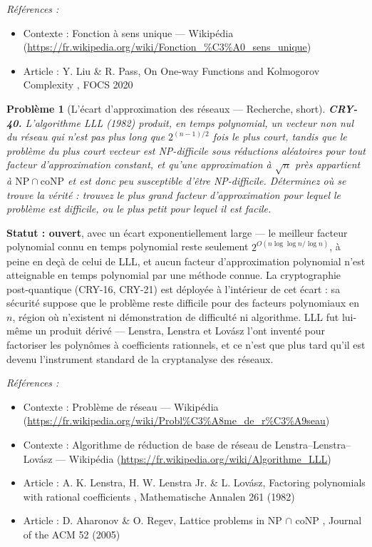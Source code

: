 \documentclass[11pt]{article}
\newtheorem{problem}{Problème}
\newenvironment{refs}{\par\small\noindent\emph{Références :}\begin{itemize}\setlength\itemsep{0pt}}{\end{itemize}\normalsize}
\begin{document}
\begin{refs}
\item Contexte : Fonction à sens unique --- Wikipédia (\url{https://fr.wikipedia.org/wiki/Fonction_%C3%A0_sens_unique})
\item Article : Y. Liu \& R. Pass, \og{} On One-way Functions and Kolmogorov Complexity \fg{}, FOCS 2020
\end{refs}

\bigskip

\begin{problem}[{L'écart d'approximation des réseaux --- Recherche, short}]
\textbf{CRY-40.} L'algorithme LLL (1982) produit, en temps polynomial,
un vecteur non nul du réseau qui n'est pas plus long que $2^{(n-1)/2}$ fois le plus court,
tandis que le problème du plus court vecteur est NP-difficile sous réductions aléatoires pour
tout facteur d'approximation constant, et qu'une approximation à $\sqrt{n}$ près appartient
à $\mathrm{NP} \cap \mathrm{coNP}$ et est donc peu susceptible d'être NP-difficile.
Déterminez où se trouve la vérité : trouvez le plus grand facteur d'approximation pour lequel
le problème est difficile, ou le plus petit pour lequel il est facile.
\end{problem}

\noindent \textbf{Statut : ouvert}, avec un écart exponentiellement large --- le meilleur
facteur polynomial connu en temps polynomial reste seulement $2^{O(n \log\log n / \log n)}$,
à peine en deçà de celui de LLL, et aucun facteur d'approximation polynomial n'est atteignable
en temps polynomial par une méthode connue. La cryptographie post-quantique (CRY-16, CRY-21)
est déployée à l'intérieur de cet écart : sa sécurité suppose que le problème reste difficile
pour des facteurs polynomiaux en $n$, région où n'existent ni démonstration de difficulté ni
algorithme. LLL fut lui-même un produit dérivé --- Lenstra, Lenstra et Lovász l'ont inventé pour
factoriser les polynômes à coefficients rationnels, et ce n'est que plus tard qu'il est devenu
l'instrument standard de la cryptanalyse des réseaux.

\begin{refs}
\item Contexte : Problème de réseau --- Wikipédia (\url{https://fr.wikipedia.org/wiki/Probl%C3%A8me_de_r%C3%A9seau})
\item Contexte : Algorithme de réduction de base de réseau de Lenstra--Lenstra--Lovász --- Wikipédia (\url{https://fr.wikipedia.org/wiki/Algorithme_LLL})
\item Article : A. K. Lenstra, H. W. Lenstra Jr. \& L. Lovász, \og{} Factoring polynomials with rational coefficients \fg{}, Mathematische Annalen 261 (1982)
\item Article : D. Aharonov \& O. Regev, \og{} Lattice problems in NP $\cap$ coNP \fg{}, Journal of the ACM 52 (2005)
\end{refs}
\end{document}
